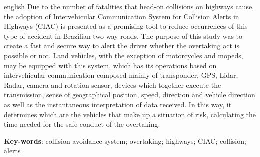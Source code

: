 \begin{resumo}[Abstract]
 \begin{otherlanguage*}{english}
   Due to the number of fatalities that head-on collisions on highways cause, the adoption of Intervehicular Communication System for Collision Alerts in Highways (CIAC) is presented as a promising tool to reduce occurrences of this type of accident in Brazilian two-way roads. The purpose of this study was to create a fast and secure way to alert the driver whether the overtaking act is possible or not. Land vehicles,  with the exception of motorcycles and mopeds, may be equipped with this system, which has its operations based on intervehicular communication composed mainly of transponder, GPS, Lidar, Radar, camera and rotation sensor, devices which together execute the transmission, sense of geographical position, speed, direction and vehicle direction as well as the instantaneous interpretation of data received. In this way, it determines which are the vehicles that make up a situation of risk, calculating the time needed for the safe conduct of the overtaking.


   \vspace{\onelineskip}

   \noindent
   \textbf{Key-words}: collision avoidance system; overtaking; highways; CIAC; collision; alerts
 \end{otherlanguage*}
\end{resumo}
